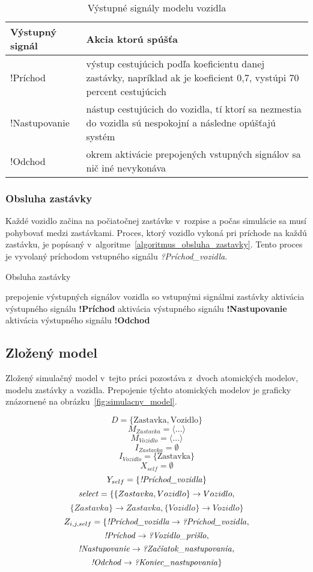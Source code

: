 \begin{table}[h]\label{tab:outputs_vozidla}
  \centering
  \begin{tabularx}{\textwidth}{|l|X|}
    \hline
    \textbf{Výstupný signál} & \textbf{Akcia ktorú spúšťa} \\ \hline
    !Príchod & výstup cestujúcich podľa koeficientu danej zastávky, napríklad ak je koeficient 0,7, vystúpi 70 percent cestujúcich \\ \hline
    !Nastupovanie & nástup cestujúcich do vozidla, tí ktorí sa nezmestia do vozidla sú nespokojní a následne opúšťajú systém \\ \hline
    !Odchod & okrem aktivácie prepojených vstupných signálov sa nič iné nevykonáva \\ \hline
  \end{tabularx}
  \caption{Výstupné signály modelu vozidla}
\end{table}

\subsubsection*{Obsluha zastávky}

Každé vozidlo začina na počiatočnej zastávke v~rozpise a počas simulácie sa musí pohybovať medzi zastávkami.
Proces, ktorý vozidlo vykoná pri príchode na každú zastávku, je popísaný v~algoritme~\ref{algoritmus_obsluha_zastavky}.
Tento proces je vyvolaný príchodom vstupného signálu \textit{?Príchod\_vozidla}.

\vspace*{\dimexpr0.5\baselineskip\relax}
\begin{algorithm}[H]\label{algoritmus_obsluha_zastavky}
\caption{Obsluha zastávky}
  prepojenie výstupných signálov vozidla so vstupnými signálmi zastávky\;
  aktivácia výstupného signálu \textbf{!Príchod}\;
  aktivácia výstupného signálu \textbf{!Nastupovanie}\;
  aktivácia výstupného signálu \textbf{!Odchod}\;
\end{algorithm}

\newpage
\subsection*{Zložený model}
Zložený simulačný model v~tejto práci pozostáva z~dvoch atomických modelov, modelu zastávky a vozidla.
Prepojenie týchto atomických modelov je graficky znázornené na obrázku~\ref{fig:simulacny_model}.

\[D = \{ \text{Zastavka}, \text{Vozidlo} \}\]
\[M_{Zastavka} = \langle \ldots \rangle\]
\[M_{Vozidlo} = \langle \ldots \rangle\]
\[I_{Zastavka} = \emptyset\]
\[I_{Vozidlo} = \{ \text{Zastavka} \}\]
\[X_{self} = \emptyset\]
\[Y_{self} = \{ \text{\textit{!Príchod\_vozidla}} \}\]
\[\text{\textit{select}} = \{ \{Zastavka,Vozidlo\} \rightarrow Vozidlo,\]
\[\{Zastavka\} \rightarrow Zastavka, \{Vozidlo\} \rightarrow Vozidlo \}\]
\[Z_{i,j,self} = \{ \text{\textit{!Príchod\_vozidla}} \rightarrow \text{\textit{?Príchod\_vozidla}},\]
\[\text{\textit{!Príchod}} \rightarrow \text{\textit{?Vozidlo\_prišlo}},\]
\[\text{\textit{!Nastupovanie}} \rightarrow \text{\textit{?Začiatok\_nastupovania}},\]
\[\text{\textit{!Odchod}} \rightarrow \text{\textit{?Koniec\_nastupovania}} \}\]

